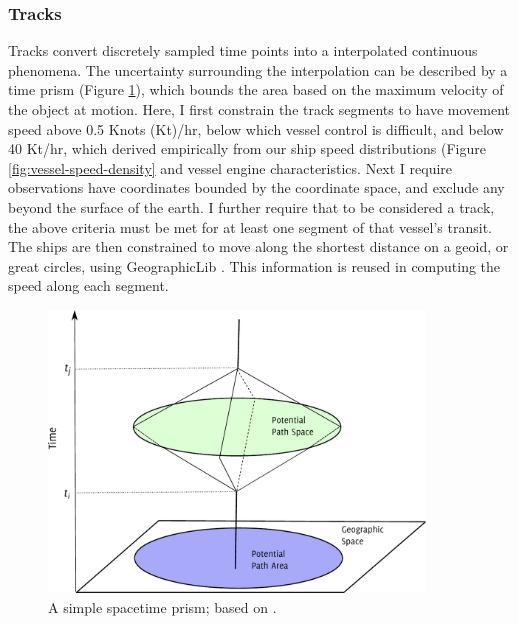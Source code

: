 \subsubsection{Tracks}

Tracks convert discretely sampled time points into a interpolated continuous phenomena. The uncertainty surrounding the interpolation can be described by a time prism (Figure \ref{fig:time-prism}), which bounds the area based on the maximum velocity of the object at motion. Here, I first constrain the track segments to have movement speed above 0.5 Knots (Kt)/hr, below which vessel control is difficult, and below 40 Kt/hr, which derived empirically from our ship speed distributions (Figure \ref{fig:vessel-speed-density} and vessel engine characteristics.  Next I require observations have coordinates bounded by the coordinate space, and exclude %
any beyond the surface of the earth. I further require that to be considered a track, the above criteria must be met for at least one segment of that vessel's transit. The ships are then constrained to move along the shortest distance on a geoid, or great circles, using GeographicLib \citep{karney2012algorithms}. This information is reused in computing the speed along each segment. %

\begin{figure}[h!]
  \centering
    \includegraphics[width=100mm]{figures/time-geography-prism.pdf}
  \caption[A simple space{\textendash}time prism]{A simple space{\textendash}time prism; based on \cite{Wu2002}.}
  \label{fig:time-prism}
\end{figure}

